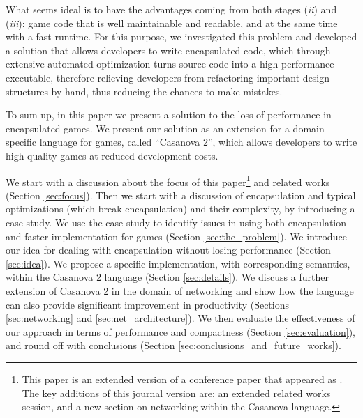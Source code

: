 What seems ideal is to have the advantages coming from both stages (\textit{ii}) and (\textit{iii}): game code that is well maintainable and readable, and at the same time with a fast runtime. For this purpose, we investigated this problem and developed a solution that allows developers to write encapsulated code, which through extensive automated optimization turns source code into a high-performance executable, therefore relieving developers from refactoring important design structures by hand, thus reducing the chances to make mistakes. 


To sum up, in this paper we present a solution to the loss of performance in encapsulated games. We present our solution as an extension for a domain specific language for games, called ``Casanova 2'', which allows developers to write high quality games at reduced development costs. 

We start with a discussion about the focus of this paper\footnote{This paper is an extended version of a conference paper that appeared as \cite{abbadi2015high}. The key additions of this journal version are: an extended related works session, and a new section on networking within the Casanova language.} and related works (Section \ref{sec:focus}). Then we start with a discussion of encapsulation and typical optimizations (which break encapsulation) and their complexity, by introducing a case study. We use the case study to identify issues in using both encapsulation and faster implementation for games (Section \ref{sec:the_problem}). We introduce our idea for dealing with encapsulation without losing performance (Section \ref{sec:idea}). We propose a specific implementation, with corresponding semantics, within the Casanova 2 language (Section \ref{sec:details}). We discuss a further extension of Casanova 2 in the domain of networking and show how the language can also provide significant improvement in productivity (Sections \ref{sec:networking} and \ref{sec:net_architecture}). We then evaluate the effectiveness of our approach in terms of performance and compactness (Section \ref{sec:evaluation}), and round off with conclusions (Section \ref{sec:conclusions_and_future_works}).

